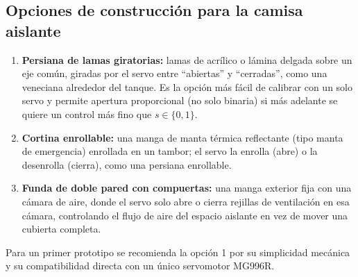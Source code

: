 \documentclass[11pt,a4paper]{article}
\begin{document}
\subsection{Opciones de construcción para la camisa aislante}
\begin{enumerate}
    \item \textbf{Persiana de lamas giratorias:} lamas de acrílico o lámina delgada sobre un eje común, giradas por el servo entre ``abiertas'' y ``cerradas'', como una veneciana alrededor del tanque. Es la opción más fácil de calibrar con un solo servo y permite apertura proporcional (no solo binaria) si más adelante se quiere un control más fino que $s\in\{0,1\}$.
    \item \textbf{Cortina enrollable:} una manga de manta térmica reflectante (tipo manta de emergencia) enrollada en un tambor; el servo la enrolla (abre) o la desenrolla (cierra), como una persiana enrollable.
    \item \textbf{Funda de doble pared con compuertas:} una manga exterior fija con una cámara de aire, donde el servo solo abre o cierra rejillas de ventilación en esa cámara, controlando el flujo de aire del espacio aislante en vez de mover una cubierta completa.
\end{enumerate}
Para un primer prototipo se recomienda la opción 1 por su simplicidad mecánica y su compatibilidad directa con un único servomotor MG996R.
\end{document}
